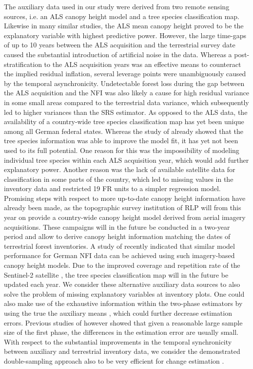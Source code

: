 The auxiliary data used in our study were derived from two remote sensing sources, i.e. an ALS canopy height model and a tree species classification map. Likewise in many similar studies, the ALS mean canopy height proved to be the explanatory variable with highest predictive power. However, the large time-gaps of up to 10 years between the ALS acquisition and the terrestrial survey date caused the substantial introduction of artificial noise in the data. Whereas a post-stratification to the ALS acquisition years was an effective means to counteract the implied residual inflation, several leverage points were unambiguously caused by the temporal asynchronicity. Undetectable forest loss during the gap between the ALS acquisition and the NFI was also likely a cause for high residual variance in some small areas compared to the terrestrial data variance, which subsequently led to higher variances than the SRS estimator. As opposed to the ALS data, the availability of a country-wide tree species classification map has yet been unique among all German federal states. Whereas the study of \citet{hill2017a} already showed that the tree species information was able to improve the model fit, it has yet not been used to its full potential. One reason for this was the impossibility of modeling individual tree species within each ALS acquisition year, which would add further explanatory power. Another reason was the lack of available satellite data for classification in some parts of the country, which led to missing values in the inventory data and restricted 19 FR units to a simpler regression model. Promising steps with respect to more up-to-date canopy height information have already been made, as the topographic survey institution of RLP will from this year on provide a country-wide canopy height model derived from aerial imagery acquisitions. These campaigns will in the future be conducted in a two-year period and allow to derive canopy height information matching the dates of terrestrial forest inventories. A study of \citet{kirchhoefer2017} recently indicated that similar model performance for German NFI data can be achieved using such imagery-based canopy height models. Due to the improved coverage and repetition rate of the Sentinel-2 satellite \citep{sentinel2}, the tree species classification map will in the future be updated each year. We consider these alternative auxiliary data sources to also solve the problem of missing explanatory variables at inventory plots. One could also make use of the exhaustive information within the two-phase estimators by using the true the auxiliary means \citep{mandallaz2013a, mandallaz2013b}, which could further decrease estimation errors. Previous studies of \citet{mandallaz2013b} however showed that given a reasonable large sample size of the first phase, the differences in the estimation error are usually small. With respect to the substantial improvements in the temporal synchronicity between auxiliary and terrestrial inventory data, we consider the demonstrated double-sampling approach also to be very efficient for change estimation \citep{massey2015b}.\par


